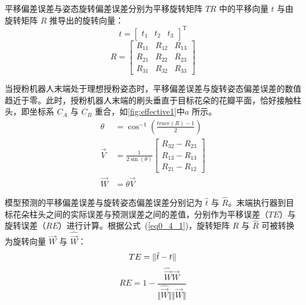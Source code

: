 平移偏差误差与姿态旋转偏差误差分别为平移旋转矩阵 $TR$ 中的平移向量 $t$ 与由旋转矩阵 $R$ 推导出的旋转向量：
\begin{equation}
	\label{eq0_3}
	t = \begin{bmatrix}
		t_1  &	t_2 &	t_3
	\end{bmatrix}^\mathrm{T}
\end{equation}
\begin{equation}
	\label{eq0_4}
	R=
	\begin{bmatrix}
		R_{11} & R_{12} & R_{13}\\
		R_{21} & R_{22} & R_{23} \\
		R_{31} & R_{32} & R_{33} 
	\end{bmatrix}
\end{equation}


当授粉机器人末端处于理想授粉姿态时，平移偏差误差与旋转姿态偏差误差的数值趋近于零。此时，授粉机器人末端的刷头垂直于目标花朵的花瓣平面，恰好接触柱头，即坐标系 $C_{A}$ 与 $C_{B}$ 重合，如\cref{fig:effective1}中$a$ 所示。
\begin{equation}
	\label{eq0_4_1}
	\begin{split}
		\theta &= \cos^{-1}(\frac{trace(R) - 1}{2})\\
		\overrightarrow{V}&= \frac{1}{2\sin(\theta)}\begin{bmatrix}
			R_{32} - R_{23}\\
			R_{13} - R_{13} \\
			R_{21} - R_{12} 
		\end{bmatrix} \\
		\overrightarrow{W} &= \theta \overrightarrow{V}
	\end{split}
\end{equation}

模型预测的平移偏差误差与旋转姿态偏差误差分别记为 $\hat{t}$ 与 $\hat{R}$。末端执行器到目标花朵柱头之间的实际误差与预测误差之间的差值，分别作为平移误差（$TE$）与旋转误差（$RE$）进行计算。根据公式~(\ref{eq0_4_1})，旋转矩阵 $R$ 与 $\hat{R}$ 可被转换为旋转向量 $\overrightarrow{W}$ 与 $\hat{\overrightarrow{W}}$：
\begin{equation}
	\label{eq0_5}
	TE = \Vert \hat{t} -t \Vert \\
\end{equation}
\begin{equation}
	\label{eq0_6}
	RE = 1 -  \frac{\hat{\overrightarrow{W}}\overrightarrow{W}}{\Vert\hat{\overrightarrow{W}}\Vert\Vert\overrightarrow{W}\Vert}
\end{equation}

